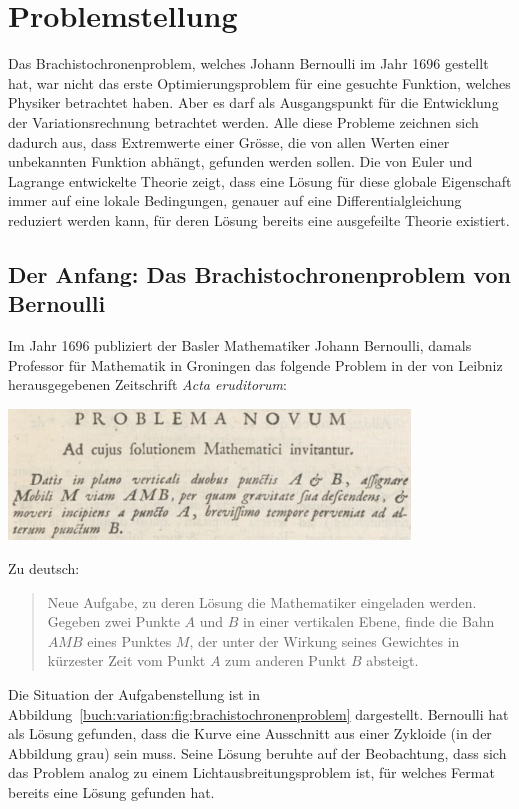 %
%
%
\section{Problemstellung
\label{buch:variation:section:problemstellung}}
Das Brachistochronenproblem, welches Johann Bernoulli im Jahr 1696
gestellt hat, war nicht das erste Optimierungsproblem für eine 
gesuchte Funktion, welches Physiker betrachtet haben.
Aber es darf als Ausgangspunkt für die Entwicklung der Variationsrechnung
betrachtet werden.
Alle diese Probleme zeichnen sich dadurch aus, dass Extremwerte
einer Grösse, die von allen Werten einer unbekannten Funktion abhängt,
gefunden werden sollen.
Die von Euler und Lagrange entwickelte Theorie zeigt, dass eine
Lösung für diese globale Eigenschaft immer auf eine lokale Bedingungen,
genauer auf eine Differentialgleichung reduziert werden kann, für deren
Lösung bereits eine ausgefeilte Theorie existiert.

%
%
\subsection{Der Anfang: Das Brachistochronenproblem von Bernoulli
\label{buch:variation:problem:subsection:brachistochrone}}

Im Jahr 1696 publiziert der Basler Mathematiker Johann Bernoulli, damals
Professor für Mathematik in Groningen das folgende Problem in der
von Leibniz herausgegebenen Zeitschrift {\em Acta eruditorum}:
\begin{center}
\includegraphics[width=0.8\textwidth]{chapters/020-variation/images/latein.jpg}
\end{center}
Zu deutsch:
\begin{quote}
Neue Aufgabe, zu deren Lösung die Mathematiker eingeladen werden.
Gegeben zwei Punkte $A$ und $B$ in einer vertikalen Ebene, finde
die Bahn $AMB$ eines Punktes $M$, der unter der Wirkung seines
Gewichtes in kürzester Zeit vom Punkt $A$ zum anderen Punkt $B$ absteigt.
\end{quote}
Die Situation der Aufgabenstellung ist in
Abbildung~\ref{buch:variation:fig:brachistochronenproblem}
dargestellt.
Bernoulli hat als Lösung gefunden, dass die Kurve eine Ausschnitt
aus einer Zykloide (in der Abbildung grau) sein muss.
Seine Lösung beruhte auf der Beobachtung, dass sich das Problem analog
zu einem Lichtausbreitungsproblem ist, für welches Fermat bereits
eine Lösung gefunden hat.

